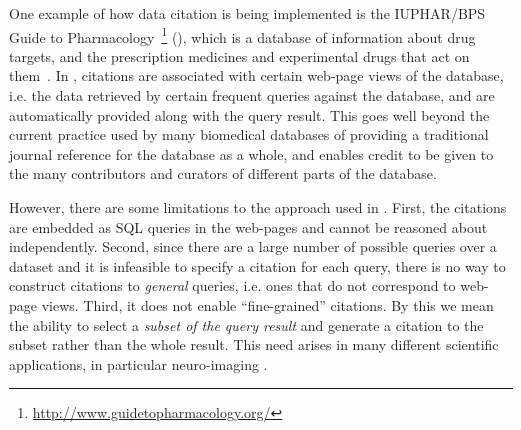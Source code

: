 
One example of how data citation is being implemented is the IUPHAR/BPS Guide to Pharmacology~\footnote{\url{http://www.guidetopharmacology.org/}} (\iuphar), which is a database of information about drug targets, and the prescription medicines and experimental drugs that act on them~\cite{DBLP:journals/nar/SouthanSBFPABDM16}. In \iuphar, citations are associated with certain web-page views of the database, i.e. the data retrieved by certain frequent queries against the database, and are automatically provided along with the query result. This goes well beyond the current practice used by many biomedical databases of providing a traditional journal reference for the database as a whole, and enables credit to be given to the many contributors and curators of different parts of the database.

However, there are some limitations to the approach used in \iuphar.  First, the citations are embedded as SQL queries in the web-pages and cannot be reasoned about independently. Second, since there are a large number of possible queries over a dataset and it is infeasible to specify a citation for each query, there is no way to construct citations to  {\em general} queries, i.e. ones that do not correspond to web-page views.  Third, it does not enable ``fine-grained'' citations.  By this we mean the ability to select a \textit{subset of the query result} and generate a citation to the subset rather than the whole result.  This need  arises in many different scientific applications, in particular neuro-imaging \cite{HonorEtAl2016}. 

